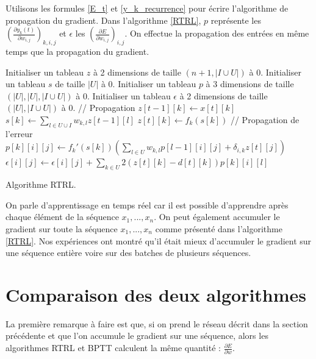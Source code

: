 Utilisons les formules \ref{E_t} et \ref{y_k_recurrence} pour écrire l'algorithme de propagation du gradient. Dans l'algorithme \ref{RTRL}, $p$ représente les $(\frac{\partial y_k(t)}{\partial w_{i,j}})_{k,i,j}$ et $\epsilon$ les $(\frac{\partial E}{\partial w_{i,j}})_{i,j}$. On effectue la propagation des entrées en même temps que la propagation du gradient.

\begin{algorithm} 
\begin{algorithmic}
\State Initialiser un tableau $z$ à 2 dimensions de taille $(n+1, |I \cup U|)$ à $0$.
\State Initialiser un tableau $s$ de taille $|U|$ à $0$.
\State Initialiser un tableau $p$ à 3 dimensions de taille $(|U|, |U|, |I \cup U|)$ à $0$.
\State Initialiser un tableau $\epsilon$ à 2 dimensions de taille $(|U|, |I \cup U|)$ à $0$.
	\State // Propagation
		\State $z[t-1][k] \leftarrow x[t][k]$
	\EndFor
		\State $s[k] \leftarrow \sum_{l \in U \cup I}{w_{k,l}z[t-1][l]}$
		\State $z[t][k] \leftarrow f_k(s[k])$
	\EndFor
	\State // Propagation de l'erreur
				\State $p[k][i][j] \leftarrow f_k'(s[k])\left(\sum_{l \in U}{w_{k,l}p[l-1][i][j]+\delta_{i,k}z[t][j]}\right)$
			\EndFor
		\EndFor
	\EndFor
			\State $\epsilon[i][j] \leftarrow \epsilon[i][j] + \sum_{k \in U}{2(z[t][k]-d[t][k])p[k][i][l]}$
		\EndFor
	\EndFor
\EndFor
\EndProcedure
\end{algorithmic} 
\caption{Algorithme RTRL.}
\label{RTRL}
\end{algorithm}

On parle d'apprentissage en temps réel car il est possible d'apprendre après chaque élément de la séquence $x_1, ..., x_n$. On peut également accumuler le gradient sur toute la séquence $x_1, ..., x_n$ comme présenté dans l'algorithme \ref{RTRL}. Nos expériences ont montré qu'il était mieux d'accumuler le gradient sur une séquence entière voire sur des batches de plusieurs séquences.

\section{Comparaison des deux algorithmes}

La première remarque à faire est que, si on prend le réseau décrit dans la section précédente et que l'on accumule le gradient sur une séquence, alors les algorithmes RTRL et BPTT calculent la même quantité : $\frac{\partial E}{\partial w}$.

